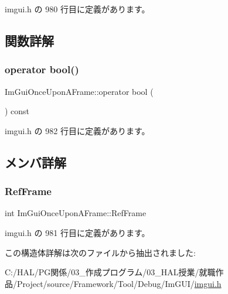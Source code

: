  imgui.\+h の 980 行目に定義があります。



\subsection{関数詳解}
\mbox{\label{struct_im_gui_once_upon_a_frame_a3c912b79bc333ce746356001431c2504}} 
\subsubsection{\texorpdfstring{operator bool()}{operator bool()}}
{\footnotesize\ttfamily Im\+Gui\+Once\+Upon\+A\+Frame\+::operator bool (\begin{DoxyParamCaption}{ }\end{DoxyParamCaption}) const\hspace{0.3cm}{\ttfamily [inline]}}



 imgui.\+h の 982 行目に定義があります。



\subsection{メンバ詳解}
\mbox{\label{struct_im_gui_once_upon_a_frame_a2d44776b8e7bdeec217f88be9f832e08}} 
\subsubsection{\texorpdfstring{Ref\+Frame}{RefFrame}}
{\footnotesize\ttfamily int Im\+Gui\+Once\+Upon\+A\+Frame\+::\+Ref\+Frame\hspace{0.3cm}{\ttfamily [mutable]}}



 imgui.\+h の 981 行目に定義があります。



この構造体詳解は次のファイルから抽出されました\+:\begin{DoxyCompactItemize}
\item 
C\+:/\+H\+A\+L/\+P\+G関係/03\+\_\+作成プログラム/03\+\_\+\+H\+A\+L授業/就職作品/\+Project/source/\+Framework/\+Tool/\+Debug/\+Im\+G\+U\+I/\mbox{\hyperlink{imgui_8h}{imgui.\+h}}\end{DoxyCompactItemize}
